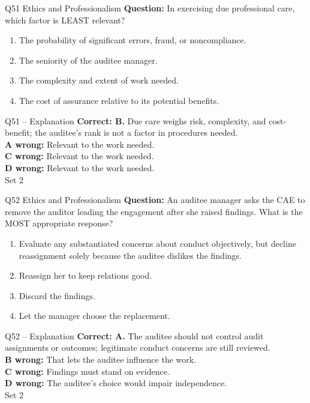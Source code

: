 \documentclass[aspectratio=169,10pt]{beamer}
\begin{document}
\begin{frame}[t]{Q51 \hfill {\scriptsize Ethics and Professionalism}}
	\small
	\textbf{Question:} In exercising due professional care, which factor is LEAST relevant?
	\begin{enumerate}[label=\Alph*.,itemsep=1pt,topsep=3pt]
			\item The probability of significant errors, fraud, or noncompliance.
			\item The seniority of the auditee manager.
			\item The complexity and extent of work needed.
			\item The cost of assurance relative to its potential benefits.
	\end{enumerate}
\end{frame}

\begin{frame}[t]{Q51 -- Explanation}
	\footnotesize
	\textbf{Correct: B.} Due care weighs risk, complexity, and cost-benefit; the auditee's rank is not a factor in procedures needed. \\[5pt]
\textbf{A wrong:} Relevant to the work needed. \\[3pt]
\textbf{C wrong:} Relevant to the work needed. \\[3pt]
\textbf{D wrong:} Relevant to the work needed. \\[3pt]
	\vfill {\tiny Set 2}
\end{frame}

\begin{frame}[t]{Q52 \hfill {\scriptsize Ethics and Professionalism}}
	\small
	\textbf{Question:} An auditee manager asks the CAE to remove the auditor leading the engagement after she raised findings. What is the MOST appropriate response?
	\begin{enumerate}[label=\Alph*.,itemsep=1pt,topsep=3pt]
			\item Evaluate any substantiated concerns about conduct objectively, but decline reassignment solely because the auditee dislikes the findings.
			\item Reassign her to keep relations good.
			\item Discard the findings.
			\item Let the manager choose the replacement.
	\end{enumerate}
\end{frame}

\begin{frame}[t]{Q52 -- Explanation}
	\footnotesize
	\textbf{Correct: A.} The auditee should not control audit assignments or outcomes; legitimate conduct concerns are still reviewed. \\[5pt]
\textbf{B wrong:} That lets the auditee influence the work. \\[3pt]
\textbf{C wrong:} Findings must stand on evidence. \\[3pt]
\textbf{D wrong:} The auditee's choice would impair independence. \\[3pt]
	\vfill {\tiny Set 2}
\end{frame}
\end{document}
